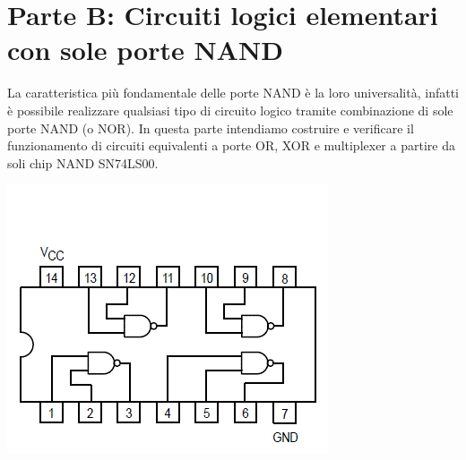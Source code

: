 \documentclass[10pt, a4paper, italian]{article}
\begin{document}
\section*{Parte B: Circuiti logici elementari con sole porte NAND}
\begin{minipage}{0.7\textwidth}
	La caratteristica più fondamentale delle porte NAND è la loro universalità,
infatti è possibile realizzare qualsiasi tipo di circuito logico tramite
combinazione di sole porte NAND (o NOR).
In questa parte intendiamo costruire e verificare il funzionamento di circuiti equivalenti a porte OR, XOR e
multiplexer a partire da soli chip NAND SN74LS00.
\end{minipage}
\begin{minipage}{0.3\textwidth}
	\includegraphics[width=\textwidth]{NAND}
\end{minipage}
\end{document}
